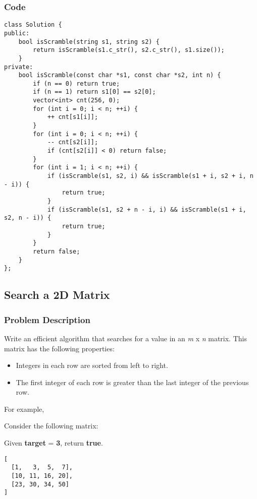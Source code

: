 \documentclass[courier]{article}
\begin{document}
\begin{CJK*}{UTF8}{gkai}
\subsubsection*{Code}
\begin{lstlisting}
class Solution {
public:
    bool isScramble(string s1, string s2) {
        return isScramble(s1.c_str(), s2.c_str(), s1.size());
    }
private:
    bool isScramble(const char *s1, const char *s2, int n) {
        if (n == 0) return true;
        if (n == 1) return s1[0] == s2[0];
        vector<int> cnt(256, 0);
        for (int i = 0; i < n; ++i) {
            ++ cnt[s1[i]];
        }
        for (int i = 0; i < n; ++i) {
            -- cnt[s2[i]];
            if (cnt[s2[i]] < 0) return false;
        }
        for (int i = 1; i < n; ++i) {
            if (isScramble(s1, s2, i) && isScramble(s1 + i, s2 + i, n - i)) {
                return true;
            }
            if (isScramble(s1, s2 + n - i, i) && isScramble(s1 + i, s2, n - i)) {
                return true;
            }
        }
        return false;
    }
};

\end{lstlisting}


\subsection{ Search a 2D Matrix }

\subsubsection*{Problem Description}
Write an efficient algorithm that searches for a value in an \emph{m} x \emph{n} matrix. This matrix has the following properties:

\begin{itemize}
\item Integers in each row are sorted from left to right.
\item The first integer of each row is greater than the last integer of the previous row.
\end{itemize}

For example,

Consider the following matrix:

Given \textbf{target} = \textbf{3}, return \textbf{true}.

\begin{verbatim}
[
  [1,   3,  5,  7],
  [10, 11, 16, 20],
  [23, 30, 34, 50]
]
\end{verbatim}



\end{CJK*}
\end{document}
